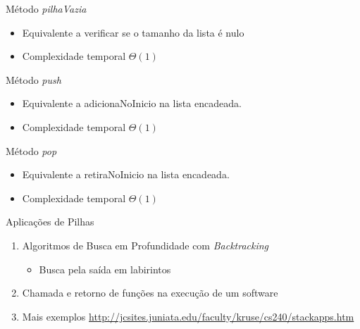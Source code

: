 \documentclass[12pt,table,xcolor={dvipsnames}]{beamer}
\begin{document}
\begin{frame}[fragile]{Método \textit{pilhaVazia}}
 \begin{itemize}
  \item Equivalente a verificar se o tamanho da lista é nulo
  \item Complexidade temporal $\Theta(1)$
 \end{itemize}      
\end{frame}

\begin{frame}[fragile]{Método \textit{push}}
 \begin{itemize}
  \item Equivalente a adicionaNoInicio na lista encadeada.
  \item Complexidade temporal $\Theta(1)$
 \end{itemize} 
\end{frame} 

\begin{frame}[fragile]{Método \textit{pop}}
 \begin{itemize}
  \item Equivalente a retiraNoInicio na lista encadeada.
  \item Complexidade temporal $\Theta(1)$
 \end{itemize} 
\end{frame} 

\begin{frame}[fragile]{Aplicações de Pilhas}
\begin{enumerate}
 \item Algoritmos de Busca em Profundidade com \textit{Backtracking} 
 \begin{itemize}
  \item Busca pela saída em labirintos
 \end{itemize}
 \item Chamada e retorno de funções na execução de um software
 \item Mais exemplos \tiny\url{http://jcsites.juniata.edu/faculty/kruse/cs240/stackapps.htm}
\end{enumerate}
\end{frame}

\end{document}
